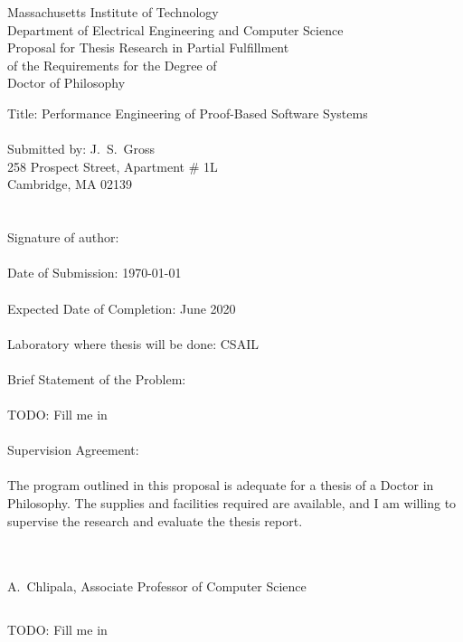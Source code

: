 \documentclass{article}
\begin{document}
\thispagestyle{empty}
\begin{center}
Massachusetts Institute of Technology \\
Department of Electrical Engineering and Computer Science \\ $\left.\right.$ \\
Proposal for Thesis Research in Partial Fulfillment \\
of the Requirements for the Degree of \\
Doctor of Philosophy
\end{center}
\noindent Title: Performance Engineering of Proof-Based Software Systems \\ \\
Submitted by: J.~S.~Gross \\
\phantom{Submitted by: }258 Prospect Street, Apartment \# 1L \\
\phantom{Submitted by: }Cambridge, MA 02139 \\ \\ \\
Signature of author: \underline{\hspace{20em}} \\ \\
Date of Submission: \today \\ \\
Expected Date of Completion: June 2020 \\ \\
Laboratory where thesis will be done: CSAIL \\ \\
Brief Statement of the Problem: \\ \\
TODO: Fill me in \\ \\
Supervision Agreement: \\ \\
The program outlined in this proposal is adequate for a thesis of a Doctor in Philosophy.
The supplies and facilities required are available, and I am willing to supervise the research and evaluate the thesis report. \\ \\
\begin{flushright}
\underline{\hspace*{25em}} \\ $\left.\right.$ \\
A.~Chlipala, Associate Professor of Computer Science
\end{flushright}
\clearpage
$\left.\right.$
\clearpage

TODO: Fill me in

%
%
\end{document}
